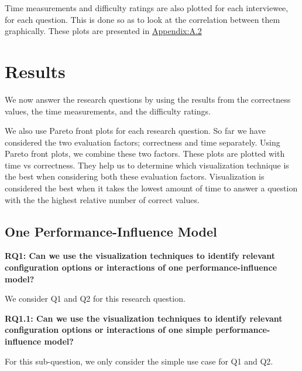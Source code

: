 Time measurements and difficulty ratings are also plotted for each interviewee, for each question. This is done so as to look at the correlation between them graphically. These plots are presented in \hyperref[sanityCheck]{Appendix:A.2}

\section{Results}
\label{sec:4.4}

We now answer the research questions by using the results from the correctness values, the time measurements, and the difficulty ratings.

We also use Pareto front plots for each research question. So far we have considered the two evaluation factors; correctness and time separately. Using Pareto front plots, we combine these two factors. These plots are plotted with time vs correctness. They help us to determine which visualization technique is the best when considering both these evaluation factors. Visualization is considered the best when it takes the lowest amount of time to answer a question with the the highest relative number of correct values.

\subsection*{One Performance-Influence Model}
\vskip 0.2in
\begin{mdframed}
\textbf{RQ1: Can we use the visualization techniques to identify relevant configuration options or interactions  of one performance-influence model?}
\end{mdframed}

We consider Q1 and Q2 for this research question.

\vskip 0.2in
\begin{mdframed}
\textbf{RQ1.1: Can we use the visualization techniques to identify relevant configuration options or interactions  of one simple performance-influence model?}
\end{mdframed}

For this sub-question, we only consider the simple use case for Q1 and Q2.

